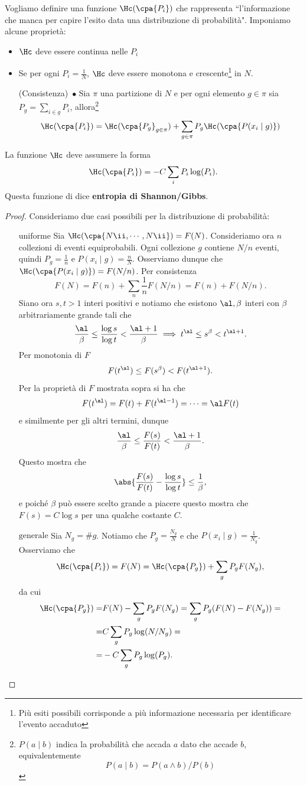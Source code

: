 \noindent
Vogliamo definire una funzione $\Hc(\cpa{P_i})$ che rappresenta ``l'informazione che manca per capire l'esito data una distribuzione di probabilit\`a". Imponiamo alcune propriet\`a:
\begin{itemize}
\item $\Hc$ deve essere continua nelle $P_i$
\item Se per ogni $P_i=\frac1N$, $\Hc$ deve essere monotona e crescente\footnote{Pi\`u esiti possibili corrisponde a pi\`u informazione necessaria per identificare l'evento accaduto} in $N$.
\item [(Consistenza)\ $\bullet$] Sia $\pi$ una partizione di $N$ e per ogni elemento $g\in \pi$ sia $P_g=\sum_{i\in g}P_i$, allora\footnote{$P(a\mid b)$ indica la probabilit\`a che accada $a$ dato che accade $b$, equivalentemente \[P(a\mid b)=P(a\wedge b)/P(b)\]}
\[\Hc(\cpa{P_i})=\Hc(\cpa{P_g}_{g\in \pi})+\sum_{g\in \pi} P_g\Hc(\cpa{P(x_i\mid g)})\]
\end{itemize}

\begin{theorem}
La funzione $\Hc$ deve assumere la forma
\[\Hc(\cpa{P_i})=-C\sum_i P_i\log(P_i).\]
Questa funzione di dice \textbf{entropia di Shannon/Gibbs}.
\end{theorem}
\begin{proof}
Consideriamo due casi possibili per la distribuzione di probabilit\`a:
\setlength{\leftmargini}{0cm}
\begin{itemize}
\item[$\boxed{\text{uniforme}}$] Sia $\Hc(\cpa{N\ii,\cdots, N\ii})=F(N)$. Consideriamo ora $n$ collezioni di eventi equiprobabili. Ogni collezione $g$ contiene $N/n$ eventi, quindi $P_g=\frac1n$ e $P(x_i\mid g)=\frac nN$. Osserviamo dunque che $\Hc(\cpa{P(x_i\mid g)})=F(N/n)$. Per consistenza
\[F(N)=F(n)+\sum_n\frac1nF(N/n)=F(n)+F(N/n).\] 
Siano ora $s,t>1$ interi positivi e notiamo che esistono $\al,\beta$ interi con $\beta$ arbitrariamente grande tali che
\[\frac\al\beta\leq\frac{\log s}{\log t}<\frac{\al+1}\beta\implies t^\al\leq s^\beta<t^{\al+1}.\]
Per monotonia di $F$
\[F(t^\al)\leq F(s^\beta)<F(t^{\al+1}).\]
Per la propriet\`a di $F$ mostrata sopra si ha che
\[F(t^\al)=F(t)+F(t^{\al-1})=\cdots=\al F(t)\]
e similmente per gli altri termini, dunque
\[\frac\al\beta\leq\frac{F(s)}{F(t)}<\frac{\al+1}\beta.\]
Questo mostra che
\[\abs{\frac{F(s)}{F(t)}-\frac{\log s}{\log t}}\leq \frac1\beta,\]
e poich\'e $\beta$ pu\`o essere scelto grande a piacere questo mostra che $F(s)=C\log s$ per una qualche costante $C$.
\item[$\boxed{\text{generale}}$] Sia $N_g=\#g$. Notiamo che $P_g=\frac{N_g}N$ e che $P(x_i\mid g)=\frac1{N_g}$. Osserviamo che
\[\Hc(\cpa{P_i})=F(N)=\Hc(\cpa{P_g})+\sum_g P_g F(N_g),\]
da cui
\begin{align*}
\Hc(\cpa{P_g})=& F(N)-\sum_g P_g F(N_g)=\sum_g P_g(F(N)-F(N_g))=\\
=& C\sum_g P_g\log(N/N_g)=\\
=&-C\sum_g P_g\log(P_g).
\end{align*}
\end{itemize}
\setlength{\leftmargini}{0.5cm}
\end{proof}

